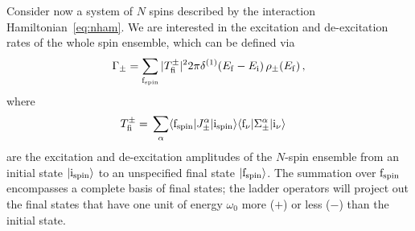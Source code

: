 \documentclass[aps,prd,10pt,twocolumn,superscriptaddress,floatfix,nofootinbib,amsmath,amssymb,altaffilletter,preprintnumbers]{revtex4-1}
\begin{document}
Consider now a system of $N$ spins described by the interaction Hamiltonian~\eqref{eq:nham}.  We are interested in the excitation and de-excitation rates of the whole spin ensemble, which can be defined via
\begin{equation}
\Gamma_\pm = \sum_{{\rm f}_{\rm spin}}|T_{\rm fi}^{\pm}|^2
2 \pi \delta^{(1)}(E_{\rm f}-E_{\rm i})\, \rho_\pm (E_{\rm f})\, ,
\label{eq:Gammapm}
\end{equation}
where 
\begin{equation}
\begin{aligned}
T^{\pm}_{\rm fi} = &\; \sum_\alpha \langle {\rm f}_{\rm spin} |  J_\pm^\alpha |{\rm i}_{\rm spin}\rangle \langle {\rm f}_\nu | \Sigma_\pm^\alpha | {\rm i}_\nu \rangle
\end{aligned}
\end{equation}
are the excitation and de-excitation amplitudes of the $N$-spin ensemble from an initial state $|{\rm i}_{\rm spin} \rangle$ to an unspecified final state $|{\rm f}_{\rm spin} \rangle$. The summation over ${\rm f}_{\rm spin}$ encompasses a complete basis of  final states; the ladder operators will project out the final states that have one unit of energy $\omega_0$ more ($+$) or less ($-$) than the initial state.  
\end{document}
